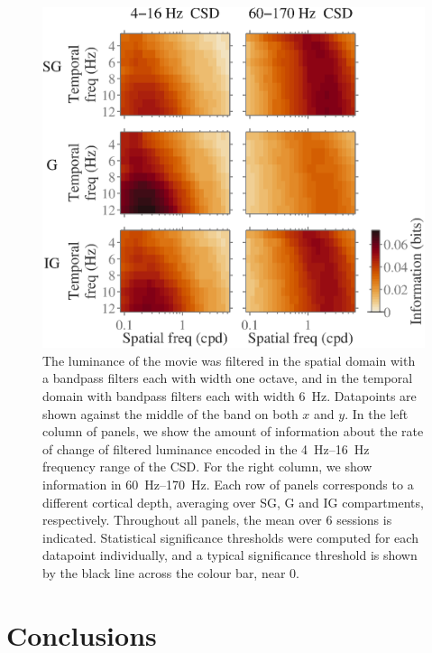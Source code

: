 \begin{figure}[htbp]
\centering
\includegraphics[scale=.5]{figs/tmf/tmf-v-spares-sggig-avg-spatmf2-2Band.eps}
%
\caption{
The luminance of the movie was filtered in the spatial domain with a bandpass filters each with width one octave, and in the temporal domain with bandpass filters each with width \SI{6}{Hz}.
Datapoints are shown against the middle of the band on both $x$ and $y$.
In the left column of panels, we show the amount of information about the rate of change of filtered luminance encoded in the \SIrange{4}{16}{Hz} frequency range of the \ac{CSD}.
For the right column, we show information in \SIrange{60}{170}{Hz}.
Each row of panels corresponds to a different cortical depth, averaging over \ac{SG}, \ac{G} and \ac{IG} compartments, respectively.
Throughout all panels, the mean over \num{6} sessions is indicated.
Statistical significance thresholds were computed for each datapoint individually, and a typical significance threshold is shown by the black line across the colour bar, near $0$.
}%
\label{fig:lam_spatmf}
%
\end{figure}


\section{Conclusions}

